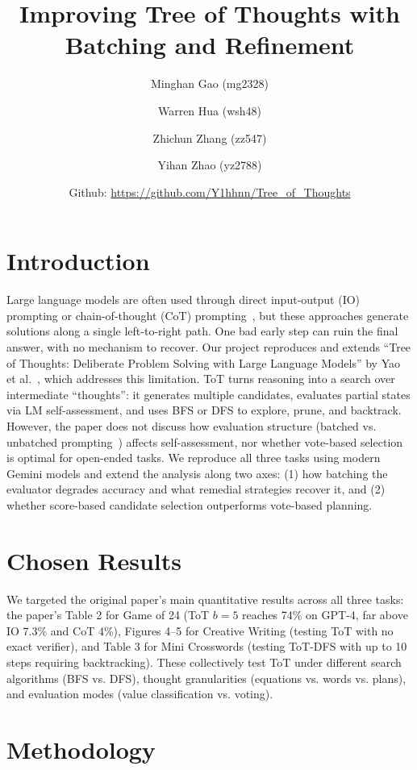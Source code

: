 \documentclass[11pt]{article}
\title{\textbf{Improving Tree of Thoughts with Batching and Refinement}}
\author{
    Minghan Gao (mg2328) \and
    Warren Hua (wsh48) \and
    Zhichun Zhang (zz547) \and
    Yihan Zhao (yz2788)
}
\date{Github: \url{https://github.com/Y1hhnn/Tree_of_Thoughts}}
\begin{document}
\maketitle

\section{Introduction}

Large language models are often used through direct input-output (IO) prompting or chain-of-thought (CoT) prompting~\cite{wei2022cot}, but these approaches generate solutions along a single left-to-right path. One bad early step can ruin the final answer, with no mechanism to recover. Our project reproduces and extends ``Tree of Thoughts: Deliberate Problem Solving with Large Language Models'' by Yao et al.~\cite{yao2023tot}, which addresses this limitation. ToT turns reasoning into a search over intermediate ``thoughts'': it generates multiple candidates, evaluates partial states via LM self-assessment, and uses BFS or DFS to explore, prune, and backtrack. However, the paper does not discuss how evaluation structure (batched vs. unbatched prompting~\cite{cheng2023batch, lin2024batchprompt}) affects self-assessment, nor whether vote-based selection is optimal for open-ended tasks. We reproduce all three tasks using modern Gemini models and extend the analysis along two axes: (1) how batching the evaluator degrades accuracy and what remedial strategies recover it, and (2) whether score-based candidate selection outperforms vote-based planning.

\section{Chosen Results}

We targeted the original paper's main quantitative results across all three tasks: the paper's Table 2 for Game of 24 (ToT $b = 5$ reaches 74\% on GPT-4, far above IO 7.3\% and CoT 4\%), Figures 4--5 for Creative Writing (testing ToT with no exact verifier), and Table 3 for Mini Crosswords (testing ToT-DFS with up to 10 steps requiring backtracking). These collectively test ToT under different search algorithms (BFS vs. DFS), thought granularities (equations vs. words vs. plans), and evaluation modes (value classification vs. voting).

\section{Methodology}
\end{document}
